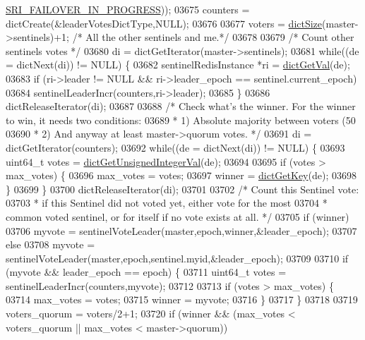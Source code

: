 \begin{DoxyCode}
{{{{{{{{{{{{{{{{{{{{{{{{{{{{{{{{{{{{{{{{{{{{{{{{{{{{{{{{{{{{{{{{{{{{{{{{{{{{{{{{{{      \hyperlink{sentinel_8c_a0546b63633196f09fcd90957243b0798}{SRI\_FAILOVER\_IN\_PROGRESS}));
03675     counters = dictCreate(&leaderVotesDictType,NULL);
03676 
03677     voters = \hyperlink{dict_8h_af193430dd3d5579a52b194512f72c1f0}{dictSize}(master->sentinels)+1; \textcolor{comment}{/* All the other sentinels and me.*/}
03678 
03679     \textcolor{comment}{/* Count other sentinels votes */}
03680     di = dictGetIterator(master->sentinels);
03681     \textcolor{keywordflow}{while}((de = dictNext(di)) != NULL) \{
03682         sentinelRedisInstance *ri = \hyperlink{dict_8h_ae8d2cc391873b2bea2b87c4f80f43120}{dictGetVal}(de);
03683         \textcolor{keywordflow}{if} (ri->leader != NULL && ri->leader\_epoch == sentinel.current\_epoch)
03684             sentinelLeaderIncr(counters,ri->leader);
03685     \}
03686     dictReleaseIterator(di);
03687 
03688     \textcolor{comment}{/* Check what's the winner. For the winner to win, it needs two conditions:}
03689 \textcolor{comment}{     * 1) Absolute majority between voters (50%
03690 \textcolor{comment}{     * 2) And anyway at least master->quorum votes. */}
03691     di = dictGetIterator(counters);
03692     \textcolor{keywordflow}{while}((de = dictNext(di)) != NULL) \{
03693         uint64\_t votes = \hyperlink{dict_8h_ad65abe818fa141e537800699668a7f09}{dictGetUnsignedIntegerVal}(de);
03694 
03695         \textcolor{keywordflow}{if} (votes > max\_votes) \{
03696             max\_votes = votes;
03697             winner = \hyperlink{dict_8h_a3271c334309904a3086deca94f96e46e}{dictGetKey}(de);
03698         \}
03699     \}
03700     dictReleaseIterator(di);
03701 
03702     \textcolor{comment}{/* Count this Sentinel vote:}
03703 \textcolor{comment}{     * if this Sentinel did not voted yet, either vote for the most}
03704 \textcolor{comment}{     * common voted sentinel, or for itself if no vote exists at all. */}
03705     \textcolor{keywordflow}{if} (winner)
03706         myvote = sentinelVoteLeader(master,epoch,winner,&leader\_epoch);
03707     \textcolor{keywordflow}{else}
03708         myvote = sentinelVoteLeader(master,epoch,sentinel.myid,&leader\_epoch);
03709 
03710     \textcolor{keywordflow}{if} (myvote && leader\_epoch == epoch) \{
03711         uint64\_t votes = sentinelLeaderIncr(counters,myvote);
03712 
03713         \textcolor{keywordflow}{if} (votes > max\_votes) \{
03714             max\_votes = votes;
03715             winner = myvote;
03716         \}
03717     \}
03718 
03719     voters\_quorum = voters/2+1;
03720     \textcolor{keywordflow}{if} (winner && (max\_votes < voters\_quorum || max\_votes < master->quorum))
}}}}}}}}}}}}}}}}}}}}}}}}}}}}}}}}}}}}}}}}}}}}}}}}}}}}}}}}}}}}}}}}}}}}}}}}}}}}}}}}}}}
\end{DoxyCode}
